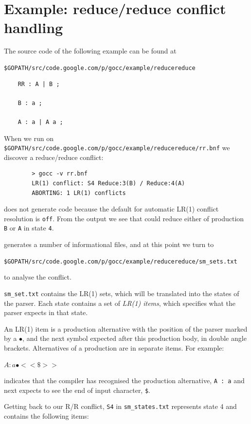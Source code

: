 \documentclass[12pt]{article}
\begin{document}
\section{Example: reduce/reduce conflict handling} \label{sec:example rr}
	The source code of the following example can be found at

	\verb|$GOPATH/src/code.google.com/p/gocc/example/reducereduce|

	\begin{verbatim}
	RR : A | B ;

	B : a ;

	A : a | A a ;

	\end{verbatim}

	When we run \gocc on \verb|$GOPATH/src/code.google.com/p/gocc/example/reducereduce/rr.bnf| we discover a reduce/reduce conflict:

	\begin{verbatim}
		> gocc -v rr.bnf
		LR(1) conflict: S4 Reduce:3(B) / Reduce:4(A)
		ABORTING: 1 LR(1) conflicts
	\end{verbatim}

	\gocc does not generate code because the default for automatic LR(1) conflict resolution is \verb|off|. From the output we see that \gocc could reduce either of production \verb|B| or \verb|A| in state \verb|4|.

	\gocc generates a number of informational files, and at this point we turn to 

	\verb|$GOPATH/src/code.google.com/p/gocc/example/reducereduce/sm_sets.txt|

	to analyse the conflict.

	\verb|sm_set.txt| contains the LR(1) sets, which will be translated into the states of the parser. Each state contains a set of {\em LR(1)  items}, which specifies what the parser expects in that state. 

	An LR(1) item is a production alternative with the position of the parser marked by a $\bullet$, and the next symbol expected after this production body, in double angle brackets. Alternatives of a production are in  separate items. For example: 

	$A : a\bullet <<\$>>$

	indicates that the compiler has recognised the production alternative, \verb|A : a| and  next expects to see the end of input character, \verb|$|.

	Getting back to our R/R conflict, \verb|S4|  in \verb|sm_states.txt| represents state 4 and contains the following items:
\end{document}
